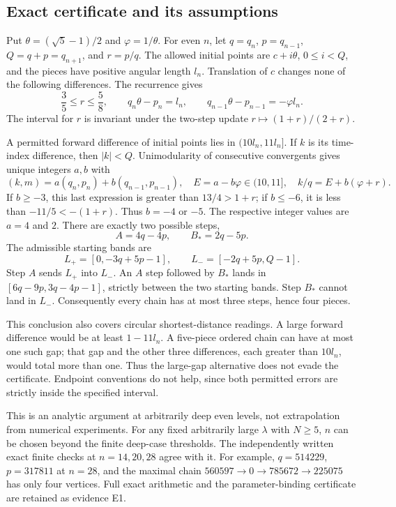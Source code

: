 \documentclass[10pt]{article}
\begin{document}
\subsection*{Exact certificate and its assumptions}
Put \(\theta=(\sqrt5-1)/2\) and \(\varphi=1/\theta\). For even \(n\), let \(q=q_n\), \(p=q_{n-1}\), \(Q=q+p=q_{n+1}\), and \(r=p/q\). The allowed initial points are \(c+i\theta\), \(0\leq i<Q\), and the pieces have positive angular length \(l_n\). Translation of \(c\) changes none of the following differences. The recurrence gives \[\frac35\leq r\leq\frac58,\qquad
  q_n\theta-p_n=l_n,\qquad
  q_{n-1}\theta-p_{n-1}=-\varphi l_n.\] The interval for \(r\) is invariant under the two-step update \(r\mapsto(1+r)/(2+r)\).\par
A permitted forward difference of initial points lies in \((10l_n,11l_n]\). If \(k\) is its time-index difference, then \(|k|<Q\). Unimodularity of consecutive convergents gives unique integers \(a,b\) with \[(k,m)=a(q_n,p_n)+b(q_{n-1},p_{n-1}),\quad
 E=a-b\varphi\in(10,11],\quad
 k/q=E+b(\varphi+r).\] If \(b\geq-3\), this last expression is greater than \(13/4>1+r\); if \(b\leq-6\), it is less than \(-11/5<-(1+r)\). Thus \(b=-4\) or \(-5\). The respective integer values are \(a=4\) and \(2\). There are exactly two possible steps, \[A=4q-4p,\qquad B_*=2q-5p.\] The admissible starting bands are \[L_+=[0,-3q+5p-1],\qquad L_-=[-2q+5p,Q-1].\] Step \(A\) sends \(L_+\) into \(L_-\). An \(A\) step followed by \(B_*\) lands in \([6q-9p,3q-4p-1]\), strictly between the two starting bands. Step \(B_*\) cannot land in \(L_-\). Consequently every chain has at most three steps, hence four pieces.\par
This conclusion also covers circular shortest-distance readings. A large forward difference would be at least \(1-11l_n\). A five-piece ordered chain can have at most one such gap; that gap and the other three differences, each greater than \(10l_n\), would total more than one. Thus the large-gap alternative does not evade the certificate. Endpoint conventions do not help, since both permitted errors are strictly inside the specified interval.\par
This is an analytic argument at arbitrarily deep even levels, not extrapolation from numerical experiments. For any fixed arbitrarily large \(\lambda\) with \(N\geq5\), \(n\) can be chosen beyond the finite deep-case thresholds. The independently written exact finite checks at \(n=14,20,28\) agree with it. For example, \(q=514229\), \(p=317811\) at \(n=28\), and the maximal chain \(560597\to0\to785672\to225075\) has only four vertices. Full exact arithmetic and the parameter-binding certificate are retained as evidence E1.\par
\end{document}
